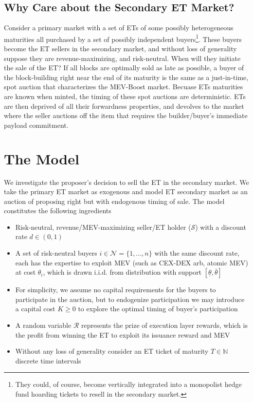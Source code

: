 \documentclass[a4paper,11pt]{article}
\begin{document}
\subsection{Why Care about the Secondary ET Market?}
Consider a primary market with a set of ETs of some possibly heterogeneous maturities all purchased by a set of possibly independent buyers\footnote{They could, of course, become vertically integrated into a monopolist hedge fund hoarding tickets to resell in the secondary market.}. These buyers become the ET sellers in the secondary market, and without loss of generality suppose they are revenue-maximizing, and risk-neutral. When will they initiate the sale of the ET? If all blocks are optimally sold as late as possible, a buyer of the block-building right near the end of its maturity is the same as a just-in-time, spot auction that characterizes the MEV-Boost market. Becuase ETs maturities are known when minted, the timing of these spot auctions are deterministic. ETs are then deprived of all their forwardness properties, and devolves to the market where the seller auctions off the item that requires the builder/buyer's immediate payload commitment. 
\section{The Model}
We investigate the proposer's decision to sell the ET in the secondary market. We take the primary ET market as exogenous and model ET secondary market as an auction of proposing right but with endogenous timing of sale. The model constitutes the following ingredients
\begin{itemize}
    \item Risk-neutral, revenue/MEV-maximizing seller/ET holder (\(\mathcal{S}\)) with a discount rate \(d\in(0,1)\) 
    \item A set of risk-neutral buyers \(i\in \mathcal{N}=\{1,...,n\}\) with the same discount rate, each has the expertise to exploit MEV (such as CEX-DEX arb, atomic MEV) at cost \(\theta_i\), which is drawn i.i.d. from distribution with support \([\underline{\theta}, \bar{\theta}]\)
    \item For simplicity, we assume no capital requirements for the buyers to participate in the auction, but to endogenize participation we may introduce a capital cost \(K\geq 0\) to explore the optimal timing of buyer's participation 
    \item A random variable \(\mathcal{R}\) represents the prize of execution layer rewards, which is the profit from winning the ET to exploit its issuance reward and MEV
    \item Without any loss of generality consider an ET ticket of maturity \(T\in\mathbb{N}\) discrete time intervals
\end{itemize}
\end{document}
